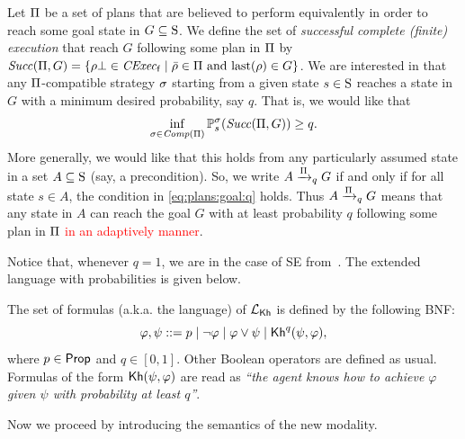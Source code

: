 Let $\plans$ be a set of plans that are believed to perform
equivalently in order to reach some goal state in $G\subseteq\S$.  We
define the set of \emph{successful complete (finite) execution} that
reach $G$ following some plan in $\plans$ by
$\Succ(\plans,G)=\{{\rho\complete\in\cexecf}\mid{\bar{\rho}\in\plans
  \text{ and } \last(\rho)\in G}\}$.
%
We are interested in that any $\plans$-compatible strategy $\strat$
starting from a given state $s\in\S$ reaches a state in $G$ with a
minimum desired probability, say $q$.  That is, we would like that
%
\begin{equation}\label{eq:plans:goal:q}
  \inf_{\strat \in\Comp(\plans)}\Prob^\strat_s(\Succ(\plans,G)) \geq q.
\end{equation}
%
More generally, we would like that this holds from any particularly
assumed state in a set $A\subseteq\S$ (say, a precondition).  So, we
write $A \reach{\plans}_q G$ if and only if for all state $s\in A$,
the condition in \cref{eq:plans:goal:q} holds.
%
Thus $A \reach{\plans}_q G$ means that any state in $A$ can reach the
goal $G$ with at least probability $q$ following some plan in $\plans$
\textcolor{red}{in an adaptively manner}.









Notice that, whenever $q=1$, we are in the case of SE from~.  The extended language with probabilities is given below.


\begin{definition}
    \label{def:syntax-extended}
    The set of formulas (a.k.a. the language) of $\Khlogic$ is defined by the following BNF:
    \[
        \varphi, \psi ::= p \mid \neg \varphi \mid \varphi \vee \psi \mid \kh^q(\psi,\varphi),
    \]
    where $p\in\Prop$ and $q\in[0,1]$. Other Boolean operators are defined as usual. Formulas of the form $\kh(\psi,\varphi)$ are read as \emph{``the agent knows how to achieve $\varphi$ given $\psi$ with probability at least $q$''}.
\end{definition}




Now we proceed by introducing the semantics of the new modality.

